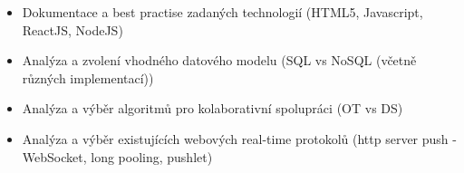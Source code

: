 
\begin{itemize}
    \item Dokumentace a best practise zadaných technologií (HTML5, Javascript, ReactJS, NodeJS)
    \item Analýza a zvolení vhodného datového modelu (SQL vs NoSQL (včetně různých implementací))
    \item Analýza a výběr algoritmů pro kolaborativní spolupráci (OT vs DS)
    \item Analýza a výběr existujících webových real-time protokolů (http server push - WebSocket, long pooling, pushlet)
\end{itemize}
